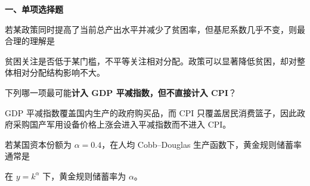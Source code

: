 ﻿


\textbf{一、单项选择题}

\begin{question}
若某政策同时提高了当前总产出水平并减少了贫困率，但基尼系数几乎不变，则最合理的理解是
\begin{choiceoptions}[1]
\end{choiceoptions}
\begin{solution}
贫困关注是否低于某门槛，不平等关注相对分配。政策可以显著降低贫困，却对整体相对分配结构影响不大。
\end{solution}
\end{question}

\begin{question}
下列哪一项最可能\textbf{计入 GDP 平减指数，但不直接计入 CPI}？
\begin{choiceoptions}[2]
\end{choiceoptions}
\begin{solution}
GDP 平减指数覆盖国内生产的政府购买品，而 CPI 只覆盖居民消费篮子，因此政府采购国产军用设备价格上涨会进入平减指数而不进入 CPI。
\end{solution}
\end{question}

\begin{question}
若某国资本份额为 $\alpha=0.4$，在人均 Cobb--Douglas 生产函数下，黄金规则储蓄率通常是
\begin{choiceoptions}[2]
\end{choiceoptions}
\begin{solution}
在 $y=k^{\alpha}$ 下，黄金规则储蓄率为 $\alpha$。
\end{solution}
\end{question}

